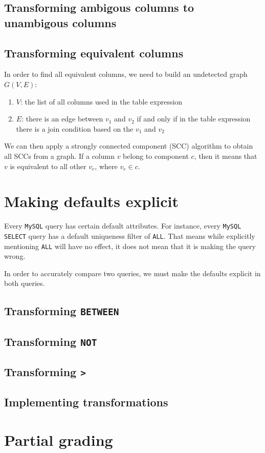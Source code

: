 \subsection{Transforming ambigous columns to unambigous columns}
\subsection{Transforming equivalent columns}
In order to find all equivalent columns, we need to build an undetected graph $G(V, E)$:

\begin{enumerate}
    \item $V$: the list of all columns used in the table expression
    \item $E$: there is an edge between $v_1$ and $v_2$ if and only if in the table expression there is a join condition based on the $v_1$ and $v_2$
\end{enumerate}

We can then apply a strongly connected component (SCC) algorithm to obtain all SCCs from a graph. If a column $v$ belong to component $c$, then it means that $v$ is equivalent to all other $v_e$, where $v_e \in c$.

\section{Making defaults explicit}

Every \texttt{MySQL} query has certain default attributes. For instance, every \texttt{MySQL SELECT} query has a default uniqueness filter of \texttt{ALL}. That means while explicitly mentioning \texttt{ALL} will have no effect, it does not mean that it is making the query wrong.

In order to accurately compare two queries, we must make the defaults explicit in both queries.

\subsection{Transforming \texttt{BETWEEN}}
\subsection{Transforming \texttt{NOT}}
\subsection{Transforming \texttt{>}}


\subsection{Implementing transformations}

\section{Partial grading}
